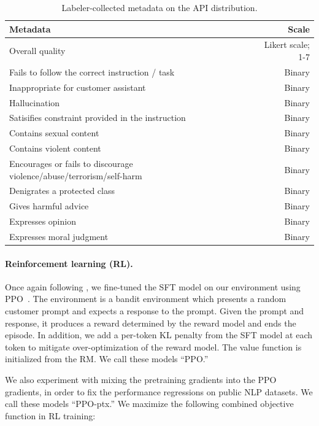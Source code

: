 \documentclass{article}
\begin{document}
\begin{table}[]
    \centering
    \caption{Labeler-collected metadata on the API distribution.}
    \label{tab:metadata_types}
    \small
    \begin{tabular}{lr}
    \toprule
    Metadata & Scale \\
    \midrule
Overall quality & Likert scale; 1-7 \\
Fails to follow the correct instruction / task & Binary		 \\
Inappropriate for customer assistant & Binary	 \\
Hallucination & Binary \\
Satisifies constraint provided in the instruction & Binary	 \\
Contains sexual content & Binary		 \\
Contains violent content & Binary		 \\
Encourages or fails to discourage violence/abuse/terrorism/self-harm & Binary	 \\	
Denigrates a protected class & Binary		 \\
Gives harmful advice & Binary		 \\
Expresses opinion & Binary		 \\
Expresses moral judgment & Binary \\
\bottomrule
    \end{tabular}
\end{table}

\paragraph{Reinforcement learning (RL).} Once again following \citet{stiennon2020learning}, we fine-tuned the SFT model on our environment using PPO~\citep{schulman2017proximal}. The environment
is a bandit environment which presents a random customer prompt and expects a response to the prompt.  Given the prompt and response, it produces a reward determined by the reward model and ends the episode.  In addition, we add a per-token KL penalty from the SFT model at each token to mitigate over-optimization of the reward model.  The value function is initialized from the RM. We call these models ``PPO.''

We also experiment with mixing the pretraining gradients into the PPO gradients, in order to fix the performance regressions on public NLP datasets. We call these models ``PPO-ptx.''  We maximize the following combined objective function in RL training:
\end{document}
